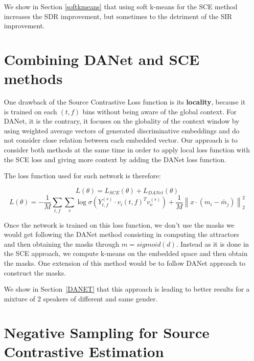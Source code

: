 \documentclass[master, tikz, final,11pt, dvipdfmx]{iscs-thesis}
\newcommand{\norm}[1]{\left\lVert#1\right\rVert}
\begin{document}
We show in Section \ref{softkmeans} that using soft k-means for the SCE method increases the SDR improvement, but sometimes to the detriment of the SIR improvement.



\section{Combining DANet and SCE methods}
\label{contrib:danet}

One drawback of the Source Contrastive Loss function is its \textbf{locality}, because it is trained on each $(t,f)$ bins without being aware of the global context. For DANet, it is the contrary, it focuses on the globality of the context window by using weighted average vectors of generated discriminative embeddings and do not consider close relation between each embedded vector.
Our approach is to consider both methods at the same time in order to apply local loss function with the SCE loss and giving more context by adding the DANet loss function.

The loss function used for such network is therefore:

\[L(\theta) = L_{SCE}(\theta) + L_{DANet}(\theta)\]
\[L(\theta) = - \frac{1}{M} \sum_{t,f} \sum_{s} \log \sigma(Y_{t,f}^{(s)} \cdot v_i(t,f)^{T} v_o^{(s)}) + \frac{1}{M} \norm{x \cdot (m_i - \tilde{m_j})}^2_2\]

Once the network is trained on this loss function, we don't use the masks we would get following the DANet method consisting in computing the attractors and then obtaining the masks through $m = sigmoid(d)$. Instead as it is done in the SCE approach, we compute k-means on the embedded space and then obtain the masks. One extension of this method would be to follow DANet approach to construct the masks.

We show in Section~\ref{DANET} that this approach is leading to better results for a mixture of 2 speakers of different and same gender.


\section{Negative Sampling for Source Contrastive Estimation}
\end{document}
